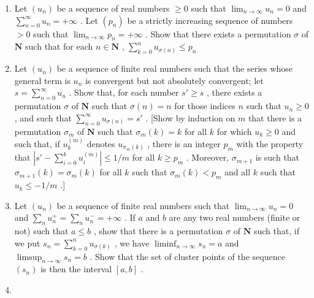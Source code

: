 \begin{enumerate}
\def\labelenumi{\arabic{enumi})}
\setcounter{enumi}{12}
\item
  Let \((u_n)\) be a sequence of real numbers \(\geqslant 0\) such that \(\lim_{n\to \infty}u_n = 0\) and \(\sum_{n = 0}^{\infty}u_n = +\infty\) . Let \((p_n)\) be a strictly increasing sequence of numbers \(>0\) such that \(\lim_{n\to \infty}p_n = +\infty\) . Show that there exists a permutation \(\sigma\) of \(\mathbf{N}\) such that for each \(n\in \mathbf{N}\) , \(\sum_{k = 0}^{n}u_{\sigma (n)}\leqslant p_n\)
\item
  Let \((u_{n})\) be a sequence of finite real numbers such that the series whose general term is \(u_{n}\) is convergent but not absolutely convergent; let \(s = \sum_{n=0}^{\infty} u_{n}\) . Show that, for each number \(s' \geqslant s\) , there exists a permutation \(\sigma\) of \(\mathbf{N}\) such that \(\sigma(n) = n\) for those indices \(n\) such that \(u_{n} \geqslant 0\) , and such that \(\sum_{n=0}^{\infty} u_{\sigma(n)} = s'\) . {[}Show by induction on \(m\) that there is a permutation \(\sigma_m\) of \(\mathbf{N}\) such that \(\sigma_m(k) = k\) for all \(k\) for which \(u_k \geqslant 0\) and such that, if \(u_k^{(m)}\) denotes \(u_{\sigma_m(k)}\) , there is an integer \(p_m\) with the property that \(\left| s' - \sum_{i=0}^{k} u_i^{(m)} \right| \leqslant 1/m\) for all \(k \geqslant p_m\) . Moreover, \(\sigma_{m+1}\) is such that \(\sigma_{m+1}(k) = \sigma_m(k)\) for all \(k\) such that \(\sigma_m(k) < p_m\) and all \(k\) such that \(u_k \leqslant -1/m\) .{]}
\item
  Let \((u_{n})\) be a sequence of finite real numbers such that \(\lim_{n\to \infty}u_n = 0\) and \(\sum_{n}u_{n}^{+} = \sum_{n}u_{n}^{-} = +\infty\) . If \(a\) and \(b\) are any two real numbers (finite or not) such that \(a\leqslant b\) , show that there is a permutation \(\sigma\) of \(\mathbf{N}\) such that, if we put \(s_n = \sum_{k = 0}^n u_{\sigma (k)}\) , we have \(\liminf_{n\to \infty}s_n = a\) and \(\limsup_{n\to \infty}s_n = b\) . Show that the set of cluster points of the sequence \((s_n)\) is then the interval \([a,b]\) .
\item

\end{enumerate}
